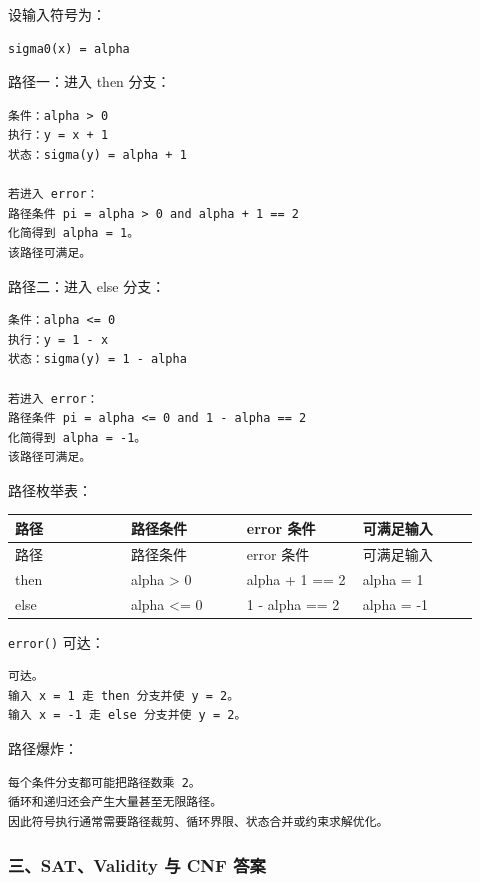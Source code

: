 \documentclass[UTF8]{ctexart}
\begin{document}
设输入符号为：

\begin{Verbatim}[fontsize=\small,breaklines=true]
sigma0(x) = alpha
\end{Verbatim}

路径一：进入 then 分支：

\begin{Verbatim}[fontsize=\small,breaklines=true]
条件：alpha > 0
执行：y = x + 1
状态：sigma(y) = alpha + 1

若进入 error：
路径条件 pi = alpha > 0 and alpha + 1 == 2
化简得到 alpha = 1。
该路径可满足。
\end{Verbatim}

路径二：进入 else 分支：

\begin{Verbatim}[fontsize=\small,breaklines=true]
条件：alpha <= 0
执行：y = 1 - x
状态：sigma(y) = 1 - alpha

若进入 error：
路径条件 pi = alpha <= 0 and 1 - alpha == 2
化简得到 alpha = -1。
该路径可满足。
\end{Verbatim}

路径枚举表：

\begin{longtable}{|p{0.23\linewidth}|p{0.23\linewidth}|p{0.23\linewidth}|p{0.23\linewidth}|}
\hline
路径 & 路径条件 & error 条件 & 可满足输入 \\
\hline
\endfirsthead
路径 & 路径条件 & error 条件 & 可满足输入 \\
\hline
\endhead
then & alpha > 0 & alpha + 1 == 2 & alpha = 1 \\
\hline
else & alpha <= 0 & 1 - alpha == 2 & alpha = -1 \\
\hline
\end{longtable}


\texttt{error()} 可达：

\begin{Verbatim}[fontsize=\small,breaklines=true]
可达。
输入 x = 1 走 then 分支并使 y = 2。
输入 x = -1 走 else 分支并使 y = 2。
\end{Verbatim}

路径爆炸：

\begin{Verbatim}[fontsize=\small,breaklines=true]
每个条件分支都可能把路径数乘 2。
循环和递归还会产生大量甚至无限路径。
因此符号执行通常需要路径裁剪、循环界限、状态合并或约束求解优化。
\end{Verbatim}

\subsubsection*{三、SAT、Validity 与 CNF 答案}
\end{document}
